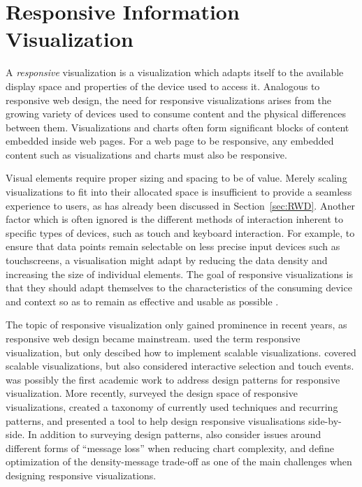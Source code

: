 
\chapter{Responsive Information Visualization}
\label{chap:ResponsiveInformationVisualization}

A \emph{responsive} visualization is a visualization which adapts
itself to the available display space and properties of the device
used to access it. Analogous to responsive web design, the need for
responsive visualizations arises from the growing variety of devices
used to consume content and the physical differences between them.
Visualizations and charts often form significant blocks of content
embedded inside web pages. For a web page to be responsive, any
embedded content such as visualizations and charts must also be
responsive.

Visual elements require proper sizing and spacing to be of
value. Merely scaling visualizations to fit into their allocated space
is insufficient to provide a seamless experience to users, as has
already been discussed in Section~\ref{sec:RWD}. Another factor which
is often ignored is the different methods of interaction inherent to
specific types of devices, such as touch and keyboard interaction. For
example, to ensure that data points remain selectable on less precise
input devices such as touchscreens, a visualisation might adapt by
reducing the data density and increasing the size of individual
elements. The goal of responsive visualizations is that they should
adapt themselves to the characteristics of the consuming device and
context so as to remain as effective and usable as possible
\parencite{DesignPatternsTradeOffsRespVis}.


The topic of responsive visualization only gained prominence in recent
years, as responsive web design became mainstream.
\textcite{BuildingRespDataVisForTheWeb} used the term responsive
visualization, but only descibed how to implement scalable
visualizations. \textcite{LearningRespDataVis} covered scalable
visualizations, but also considered interactive selection and touch
events. \textcite{RespVis} was possibly the first academic work to
address design patterns for responsive visualization.
%
More recently, \parencite{TechniquesForFlexibleRespVisDesign} surveyed
the design space of responsive visualizations, created a taxonomy of
currently used techniques and recurring patterns, and presented a tool
to help design responsive visualisations side-by-side. In addition to
surveying design patterns, \textcite{DesignPatternsTradeOffsRespVis}
also consider issues around different forms of \enquote{message loss}
when reducing chart complexity, and define optimization of the
density-message trade-off as one of the main challenges when designing
responsive visualizations.

